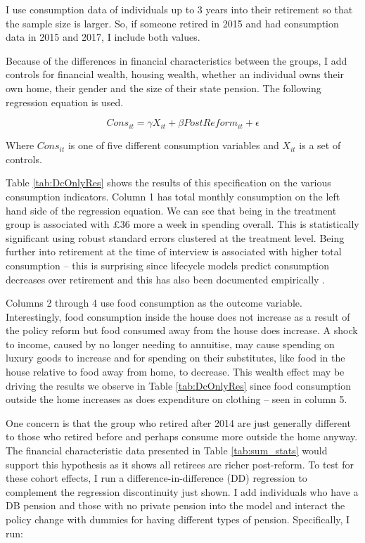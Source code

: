 \documentclass[12pt]{article}
\begin{document}
I use consumption data of individuals up to 3 years into their retirement so
that the sample size is larger. So, if someone retired in 2015 and had
consumption data in 2015 and 2017, I include both values.

Because of the differences in financial characteristics between the groups, I
add controls for financial wealth, housing wealth, whether an individual owns
their own home, their gender and the size of their state pension. The following
regression equation is used.

\begin{equation*}
    Cons_{it} =  \gamma X_{it} + \beta PostReform_{it} + \epsilon
\end{equation*}

Where $Cons_{it}$ is one of five different consumption variables and $X_{it}$ is
a set of controls.

Table \ref{tab:DcOnlyRes} shows the results of this specification on the various
consumption indicators. Column 1 has total monthly consumption on the left hand
side of the regression equation. We can see that being in the treatment group is
associated with £36 more a week in spending overall. This is statistically
significant using robust standard errors clustered at the treatment level. Being
further into retirement at the time of interview is associated with higher total
consumption -- this is surprising since lifecycle models predict consumption
decreases over retirement and this has also been documented empirically
\citep{hurd_rohwedder_nber_2003}.

Columns 2 through 4 use food consumption as the outcome variable. Interestingly,
food consumption inside the house does not increase as a result of the policy
reform but food consumed away from the house does increase. A shock to income,
caused by no longer needing to annuitise, may cause spending on luxury goods to
increase and for spending on their substitutes, like food in the house relative
to food away from home, to decrease. This wealth effect may be driving the
results we observe in Table \ref{tab:DcOnlyRes} since food consumption outside the
home increases as does expenditure on clothing -- seen in column 5.

One concern is that the group who retired after 2014 are just generally
different to those who retired before and perhaps consume more outside the home
anyway. The financial characteristic data presented in Table \ref{tab:sum_stats}
would support this hypothesis as it shows all retirees are richer post-reform.
To test for these cohort effects, I run a difference-in-difference (DD)
regression to complement the regression discontinuity just shown. I add
individuals who have a DB pension and those with no private pension into the
model and interact the policy change with dummies for having different types of
pension. Specifically, I run:
\end{document}
